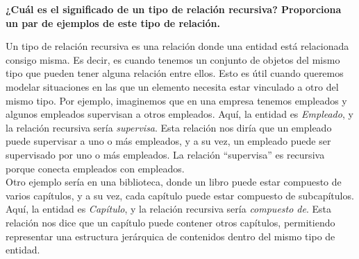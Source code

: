 \begin{center}
    \textbf{¿Cuál es el significado de un tipo de relación recursiva? Proporciona un par de ejemplos de este tipo de relación.}
\end{center}

\vspace{.3cm}

Un tipo de relación recursiva es una relación donde una entidad está relacionada consigo misma. Es decir, es cuando tenemos un conjunto de objetos del mismo tipo que pueden tener alguna relación entre ellos. Esto es útil cuando queremos modelar situaciones en las que un elemento necesita estar vinculado a otro del mismo tipo.  Por ejemplo, imaginemos que en una empresa tenemos empleados y algunos empleados supervisan a otros empleados. Aquí, la entidad es \textit{Empleado}, y la relación recursiva sería \textit{supervisa}. Esta relación nos diría que un empleado puede supervisar a uno o más empleados, y a su vez, un empleado puede ser supervisado por uno o más empleados. La relación “supervisa” es recursiva porque conecta empleados con empleados. \\

Otro ejemplo sería en una biblioteca, donde un libro puede estar compuesto de varios capítulos, y a su vez, cada capítulo puede estar compuesto de subcapítulos. Aquí, la entidad es \textit{Capítulo}, y la relación recursiva sería \textit{compuesto de}. Esta relación nos dice que un capítulo puede contener otros capítulos, permitiendo representar una estructura jerárquica de contenidos dentro del mismo tipo de entidad. \\